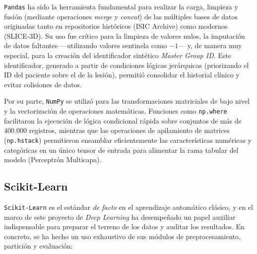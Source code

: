 \texttt{Pandas} ha sido la herramienta fundamental para realizar la carga, limpieza y fusión (mediante operaciones \textit{merge} y \textit{concat}) de las múltiples bases de datos originadas tanto en repositorios históricos (ISIC Archive) como modernos (SLICE-3D). Su uso fue crítico para la limpieza de valores nulos, la imputación de datos faltantes ---utilizando valores sentinela como $-1$--- y, de manera muy especial, para la creación del identificador sintético \textit{Master Group ID}. Este identificador, generado a partir de condiciones lógicas jerárquicas (priorizando el ID del paciente sobre el de la lesión), permitió consolidar el historial clínico y evitar colisiones de datos.

Por su parte, \texttt{NumPy} se utilizó para las transformaciones matriciales de bajo nivel y la vectorización de operaciones matemáticas. Funciones como \texttt{np.where} facilitaron la ejecución de lógica condicional rápida sobre conjuntos de más de 400.000 registros, mientras que las operaciones de apilamiento de matrices (\texttt{np.hstack}) permitieron ensamblar eficientemente las características numéricas y categóricas en un único tensor de entrada para alimentar la rama tabular del modelo (Perceptrón Multicapa).

\subsection{Scikit-Learn}

\texttt{Scikit-Learn} es el estándar \textit{de facto} en el aprendizaje automático clásico, y en el marco de este proyecto de \textit{Deep Learning} ha desempeñado un papel auxiliar indispensable para preparar el terreno de los datos y auditar los resultados. En concreto, se ha hecho un uso exhaustivo de sus módulos de preprocesamiento, partición y evaluación:

